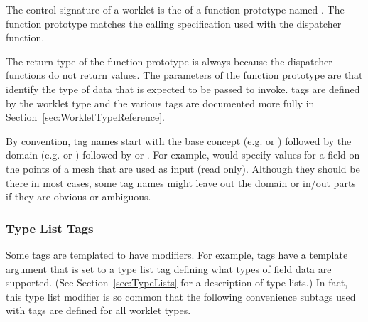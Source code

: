 
The control signature of a worklet is the  of a function
prototype named \controlsignature. The function prototype matches the
calling specification used with the dispatcher  function.


The return type of the function prototype is always  because
the dispatcher  functions do not return values. The
parameters of the function prototype are 
that identify the type of data that is expected to be passed to invoke.
\controlsignature tags are defined by the worklet type and the various tags
are documented more fully in Section~\ref{sec:WorkletTypeReference}.

By convention, \controlsignature tag names start with the base concept
(e.g.  or ) followed by the
domain (e.g.  or ) followed by
 or . For example,
 would specify values for a field on the points of a
mesh that are used as input (read only). Although they should be there in
most cases, some tag names might leave out the domain or in/out parts if
they are obvious or ambiguous.

\subsubsection{Type List Tags}
\label{sec:TypeListTags}


Some tags are templated to have modifiers. For example,
 tags have a template argument that is set to a type
list tag defining what types of field data are supported. (See
Section~\ref{sec:TypeLists} for a description of type lists.) In fact, this
type list modifier is so common that the following convenience subtags used
with  tags are defined for all worklet types.

